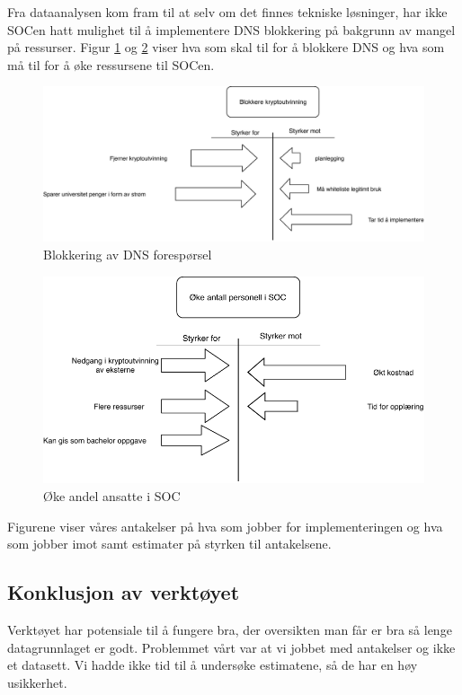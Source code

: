 Fra dataanalysen kom fram til at selv om det finnes tekniske løsninger, har ikke SOCen hatt mulighet til å implementere DNS blokkering på bakgrunn av mangel på ressurser. Figur \ref{fig:Blokkering} og \ref{fig:Oke-antall} viser hva som skal til for å blokkere DNS og hva som må til for å øke ressursene til SOCen.    
 \begin{figure}[H]
    \centering
    \includegraphics[scale=0.6]{case_3/bilder/Force-Field3.pdf}
    \caption[Blokkering]{Blokkering av DNS forespørsel}
    \label{fig:Blokkering}
\end{figure}

 \begin{figure}[H]
    \hspace{3.6cm}
    \includegraphics[scale=0.6]{case_3/bilder/Force-field4.pdf}
    \caption[Øke antall ansette i SOC]{Øke andel ansatte i SOC}
    \label{fig:Oke-antall}
\end{figure}

Figurene viser våres antakelser på hva som jobber for implementeringen og hva som jobber imot samt  estimater på styrken til antakelsene. 
\subsection{Konklusjon av verktøyet}
Verktøyet har potensiale til å fungere bra, der oversikten man får er bra så lenge datagrunnlaget er godt. Problemmet vårt var at vi jobbet med antakelser og ikke et datasett. Vi hadde ikke tid til å undersøke estimatene, så de har en høy usikkerhet.     